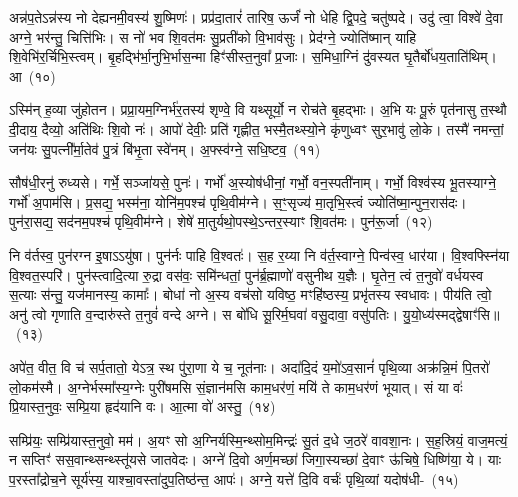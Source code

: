 {\anuvakamend[{तृ॒तीये᳚ त्वा॒ गर्भ॒ आ य॑वि॒ष्ठा यच्च॒त्वारि॑ च}]}

अन्न॑प॒ते\-ऽन्न॑स्य नो देह्यनमी॒वस्य॑ शु॒ष्मिणः॑। प्रप्र॑दा॒तारं॑ तारिष॒ ऊर्जं॑ नो धेहि द्वि॒पदे॒ चतु॑ष्पदे। उदु॑ त्वा॒ विश्वे॑ दे॒वा अग्ने॒ भर॑न्तु॒ चित्ति॑भिः। स नो॑ भव शि॒वत॑मः सु॒प्रती॑को वि॒भाव॑सुः। प्रेद॑ग्ने॒ ज्योति॑ष्मान् याहि शि॒वेभि॑र॒र्चिभि॒स्त्वम्। बृ॒हद्भि॑र्भा॒नुभि॒र्भास॒न्मा हिꣳ॑सीस्त॒नुवा᳚ प्र॒जाः। स॒मिधा॒ग्निं दु॑वस्यत घृ॒तैर्बो॑धय॒ताति॑थिम्। आ~(१०)\ip

ऽस्मि॑न् ह॒व्या जु॑होतन। प्रप्रा॒यम॒ग्निर्भ॑र॒तस्य॑ शृण्वे॒ वि यथ्सूर्यो॒ न रोच॑ते बृ॒हद्भाः। अ॒भि यः पू॒रुं पृत॑नासु त॒स्थौ दी॒दाय॒ दैव्यो॒ अति॑थिः शि॒वो नः॑। आपो॑ देवीः॒ प्रति॑ गृह्णीत॒ भस्मै॒तथ्स्यो॒ने कृ॑णुध्वꣳ सुर॒भावु॑ लो॒के। तस्मै॑ नमन्तां॒ जन॑यः सु॒पत्नी᳚र्मा॒तेव॑ पु॒त्रं बि॑भृ॒ता स्वे॑नम्। अ॒फ्स्व॑ग्ने॒ सधि॒ष्टव॒~(११)\ip

सौष॑धी॒रनु॑ रुध्यसे। गर्भे॒ सञ्जा॑यसे॒ पुनः॑। गर्भो॑ अ॒स्योष॑धीनां॒ गर्भो॒ वन॒स्पती॑नाम्। गर्भो॒ विश्व॑स्य भू॒तस्याग्ने॒ गर्भो॑ अ॒पाम॑सि। प्र॒सद्य॒ भस्म॑ना॒ योनि॑म॒पश्च॑ पृथि॒वीम॑ग्ने। स॒ꣳ॒सृज्य॑ मा॒तृभि॒स्त्वं ज्योति॑ष्मा॒न्पुन॒रास॑दः। पुन॑रा॒सद्य॒ सद॑नम॒पश्च॑ पृथि॒वीम॑ग्ने। शेषे॑ मा॒तुर्यथो॒पस्थे॒\-ऽन्तर॒स्याꣳ शि॒वत॑मः। पुन॑रू॒र्जा~(१२)\ip

नि व॑र्तस्व॒ पुन॑रग्न इ॒षा\-ऽऽ\-यु॑षा। पुन॑र्नः पाहि वि॒श्वतः॑। स॒ह र॒य्या नि व॑र्त॒स्वाग्ने॒ पिन्व॑स्व॒ धार॑या। वि॒श्वफ्स्नि॑या वि॒श्वत॒स्परि॑। पुन॑स्त्वादि॒त्या रु॒द्रा वस॑वः॒ समि॑न्धतां॒ पुन॑र्ब्र॒ह्माणो॑ वसुनीथ य॒ज्ञैः। घृ॒तेन॒ त्वं त॒नुवो॑ वर्धयस्व स॒त्याः स॑न्तु॒ यज॑मानस्य॒ कामाः᳚। बोधा॑ नो अ॒स्य वच॑सो यविष्ठ॒ मꣳहि॑ष्ठस्य॒ प्रभृ॑तस्य स्वधावः। पीय॑ति त्वो॒ अनु॑ त्वो गृणाति व॒न्दारु॑स्ते त॒नुवं॑ वन्दे अग्ने। स बो॑धि सू॒रिर्म॒घवा॑ वसु॒दावा॒ वसु॑पतिः। यु॒यो॒ध्य॑स्मद्द्वेषाꣳ॑सि॥~(१३)\ip

{\anuvakamend[{आ तवो॒र्जा\-ऽनु॒ षोड॑श च}]}

अपे॑त॒ वीत॒ वि च॑ सर्प॒तातो॒ ये\-ऽत्र॒ स्थ पु॑रा॒णा ये च॒ नूत॑नाः। अदा॑दि॒दं य॒मो॑\-ऽव॒सानं॑ पृथि॒व्या अक्र॑न्नि॒मं पि॒तरो॑ लो॒कम॑स्मै। अ॒ग्नेर्भस्मा᳚स्य॒ग्नेः पुरी॑षमसि सं॒ज्ञान॑मसि काम॒धर॑णं॒ मयि॑ ते काम॒धर॑णं भूयात्। सं या वः॑ प्रि॒यास्त॒नुवः॒ सम्प्रि॒या हृद॑यानि वः। आ॒त्मा वो॑ अस्तु॒~(१४)\ip

सम्प्रि॑यः॒ सम्प्रि॑यास्त॒नुवो॒ मम॑। अ॒यꣳ सो अ॒ग्निर्यस्मि॒न्थ्सोम॒\-मिन्द्रः॑ सु॒तं द॒धे ज॒ठरे॑ वावशा॒नः। स॒ह॒स्रियं॒ वाज॒मत्यं॒ न सप्तिꣳ॑ सस॒वान्थ्सन्थ्स्तू॑यसे जातवेदः। अग्ने॑ दि॒वो अर्ण॒मच्छा॑ जिगा॒स्यच्छा॑ दे॒वाꣳ ऊ॑चिषे॒ धिष्णि॑या॒ ये। याः प॒रस्ता᳚द्रोच॒ने सूर्य॑स्य॒ याश्चा॒वस्ता॑दुप॒तिष्ठ॑न्त॒ आपः॑। अग्ने॒ यत्ते॑ दि॒वि वर्चः॑ पृथि॒व्यां यदोष॑धी-~(१५)\ip

